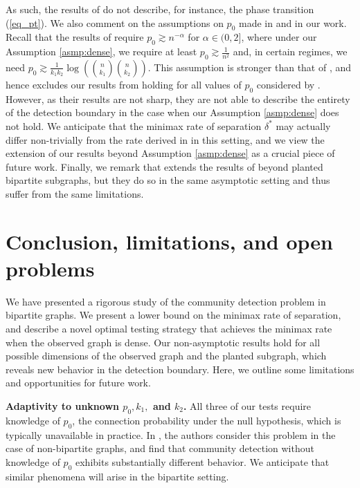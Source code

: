 \documentclass{article}
\begin{document}
As such, the results of \cite{rotenberg2024planted} do not describe, for instance, the phase transition (\ref{eq_pt}). We also comment on the assumptions on $p_0$ made in \cite{rotenberg2024planted} and in our work. Recall that the results of \cite{rotenberg2024planted} require $p_0 \gtrsim n^{-\alpha}$ for $\alpha \in (0,2]$, where under our Assumption \ref{asmp:dense}, we require at least $p_0 \gtrsim \frac{1}{n^2}$ and, in certain regimes, we need $p_0 \gtrsim \frac{1}{k_1k_2}\log( {n \choose k_1} {n \choose k_2})$. This assumption is stronger than that of \cite{rotenberg2024planted}, and hence excludes our results from holding for all values of $p_0$ considered by \cite{rotenberg2024planted}. However, as their results are not sharp, they are not able to describe the entirety of the detection boundary in the case when our Assumption \ref{asmp:dense} does not hold. We anticipate that the minimax rate of separation $\delta^*$ may actually differ non-trivially from the rate derived in \cite{rotenberg2024planted} in this setting, and we view the extension of our results beyond Assumption \ref{asmp:dense} as a crucial piece of future work. Finally, we remark that \cite{elimelech2025detecting} extends the results of \cite{rotenberg2024planted} beyond planted bipartite subgraphs, but they do so in the same asymptotic setting and thus suffer from the same limitations.

\section{Conclusion, limitations, and open problems}\label{sec:conclusion}

We have presented a rigorous study of the community detection problem in bipartite graphs. We present a lower bound on the minimax rate of separation, and describe a novel optimal testing strategy that achieves the minimax rate when the observed graph is dense. Our non-asymptotic results hold for all possible dimensions of the observed graph and the planted subgraph, which reveals new behavior in the detection boundary. Here, we outline some limitations and opportunities for future work.

\bigskip 

\noindent \textbf{Adaptivity to unknown $p_0, k_1,$ and $k_2$.} All three of our tests require knowledge of $p_0$, the connection probability under the null hypothesis, which is typically unavailable in practice. In \cite{arias2014community}, the authors consider this problem in the case of non-bipartite graphs, and find that community detection without knowledge of $p_0$ exhibits substantially different behavior. We anticipate that similar phenomena will arise in the bipartite setting.
\end{document}
